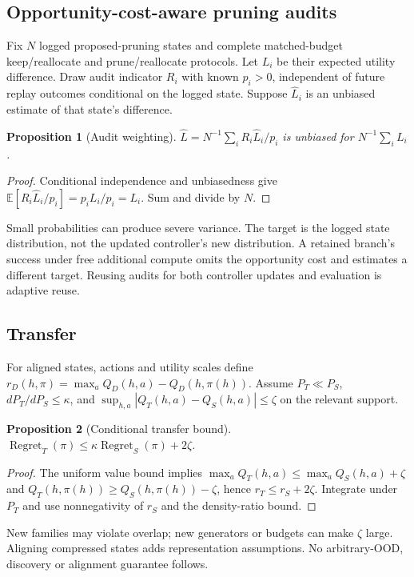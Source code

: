 \documentclass[11pt]{article}
\newtheorem{proposition}{Proposition}
\begin{document}
\subsection{Opportunity-cost-aware pruning audits}
Fix $N$ logged proposed-pruning states and complete matched-budget keep/reallocate and prune/reallocate protocols. Let $L_i$ be their expected utility difference. Draw audit indicator $R_i$ with known $p_i>0$, independent of future replay outcomes conditional on the logged state. Suppose $\widehat L_i$ is an unbiased estimate of that state's difference.
\begin{proposition}[Audit weighting]
$\widehat L=N^{-1}\sum_iR_i\widehat L_i/p_i$ is unbiased for $N^{-1}\sum_iL_i$.
\end{proposition}
\begin{proof}
Conditional independence and unbiasedness give $\mathbb E[R_i\widehat L_i/p_i]=p_iL_i/p_i=L_i$. Sum and divide by $N$.
\end{proof}
Small probabilities can produce severe variance. The target is the logged state distribution, not the updated controller's new distribution. A retained branch's success under free additional compute omits the opportunity cost and estimates a different target. Reusing audits for both controller updates and evaluation is adaptive reuse.

\subsection{Transfer}
For aligned states, actions and utility scales define $r_D(h,\pi)=\max_a Q_D(h,a)-Q_D(h,\pi(h))$. Assume $P_T\ll P_S$, $dP_T/dP_S\leq\kappa$, and $\sup_{h,a}|Q_T(h,a)-Q_S(h,a)|\leq\zeta$ on the relevant support.
\begin{proposition}[Conditional transfer bound]
$\operatorname{Regret}_T(\pi)\leq\kappa\operatorname{Regret}_S(\pi)+2\zeta$.
\end{proposition}
\begin{proof}
The uniform value bound implies $\max_aQ_T(h,a)\leq\max_aQ_S(h,a)+\zeta$ and $Q_T(h,\pi(h))\geq Q_S(h,\pi(h))-\zeta$, hence $r_T\leq r_S+2\zeta$. Integrate under $P_T$ and use nonnegativity of $r_S$ and the density-ratio bound.
\end{proof}
New families may violate overlap; new generators or budgets can make $\zeta$ large. Aligning compressed states adds representation assumptions. No arbitrary-OOD, discovery or alignment guarantee follows.
\end{document}
